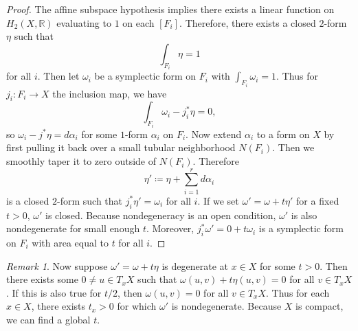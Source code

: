 \documentclass[leqno, openany]{memoir}
\theoremstyle{definition}
\theoremstyle{remark}
\newtheorem{rmk}[thm]{Remark}
\theoremstyle{plain}
\theoremstyle{definition}
\theoremstyle{remark}
\newcommand{\R}{\mathbb{R}}
\begin{document}
    \begin{proof}
        The affine subspace hypothesis implies there exists a linear function on $H_2(X, \R)$ evaluating to $1$ on each $[F_i]$. Therefore, there exists a closed $2$-form $\eta$ such that
        \[ \int_{F_i} \eta = 1 \] for all $i$. Then let $\omega_i$ be a symplectic form on $F_i$ with $\int_{F_i} \omega_i = 1$. Thus for $j_i: F_i \to X$ the inclusion map, we have
        \[ \int_{F_i} \omega_i - j_i^* \eta = 0, \]
        so $\omega_i - j^* \eta = d \alpha_i$ for some $1$-form $\alpha_i$ on $F_i$. Now extend $\alpha_i$ to a form on $X$ by first pulling it back over a small tubular neighborhood $N(F_i)$. Then we smoothly taper it to zero outside of $N(F_i)$. Therefore
        \[ \eta' \coloneqq \eta + \sum_{i=1}^r d \alpha_i \]
        is a closed $2$-form such that $j_i^* \eta' = \omega_i$ for all $i$. If we set $\omega' = \omega + t \eta'$ for a fixed $t > 0$, $\omega'$ is closed. Because nondegeneracy is an open condition, $\omega'$ is also nondegenerate for small enough $t$. Moreover, $j_i^* \omega' = 0 + t \omega_i$ is a symplectic form on $F_i$ with area equal to $t$ for all $i$.
    \end{proof}

    \begin{rmk}
        Now suppose $\omega' = \omega + t \eta$ is degenerate at $x \in X$ for some $t > 0$. Then there exists some $0 \neq u \in T_x X$ such that $\omega(u,v) + t \eta(u,v) = 0$ for all $v \in T_x X$. If this is also true for $t/2$, then $\omega(u,v) = 0$ for all $v \in T_x X$. Thus for each $x \in X$, there exists $t_x > 0$ for which $\omega'$ is nondegenerate. Because $X$ is compact, we can find a global $t$.
    \end{rmk}
\end{document}
